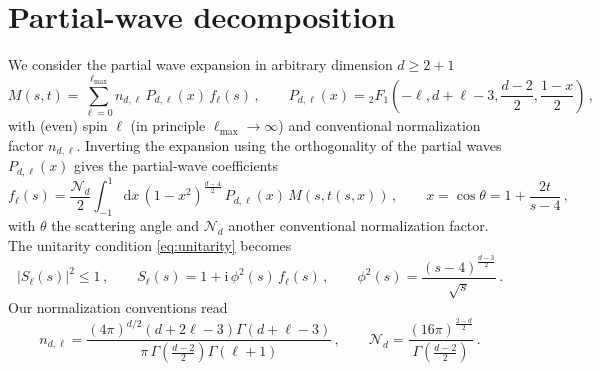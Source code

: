 \section*{Partial-wave decomposition}
We consider the partial wave expansion in arbitrary dimension $d\geq 2+1$
\begin{equation}
M(s,t)=\sum_{\ell=0}^{\ell_\mathrm{max}}n_{d,\ell}\,P_{d,\ell}(x)\,f_\ell(s)\,,
\qquad
P_{d,\ell}(x)={}_2F_1\left(-\ell,d+\ell-3,\frac{d-2}{2},\frac{1-x}{2}\right)\,,
\end{equation}
with (even) spin $\ell$ (in principle $\ell_\mathrm{max}\rightarrow\infty$) and conventional normalization factor $n_{d,\ell}$. Inverting the expansion using the orthogonality of the partial waves $P_{d,\ell}(x)$ gives the partial-wave coefficients
\begin{equation}
f_\ell(s)=\frac{\mathcal{N}_d}{2}\int_{-1}^{1}\mathrm{d}x\,(1-x^2)^{\frac{d-4}{2}}\,P_{d,\ell}(x)\,M(s,t(s,x))\,, 
\qquad
x=\cos\theta=1+\frac{2t}{s-4}\,,
\end{equation}
with $\theta$ the scattering angle and $\mathcal{N}_d$ another conventional normalization factor.
The unitarity condition \eqref{eq:unitarity} becomes
\begin{equation}
|S_\ell(s)|^2\leq 1\,,
\qquad
S_\ell(s)=1+\mathrm{i}\,\phi^2(s)\,f_\ell(s)\,, 
\qquad
\phi^2(s)=\frac{(s-4)^{\frac{d-3}{2}}}{\sqrt{s}}\,.
\label{eq:unitarity2}
\end{equation}
Our normalization conventions read
\begin{equation}
n_{d,\ell}=\frac{(4\pi)^{d/2}(d+2\ell-3)\Gamma(d+\ell-3)}{\pi\,\Gamma\left(\frac{d-2}{2}\right)\Gamma(\ell+1)}\,,
\qquad
\mathcal{N}_d=\frac{(16\pi)^{\frac{2-d}{2}}}{\Gamma\left(\frac{d-2}{2}\right)}\,.
\end{equation}



